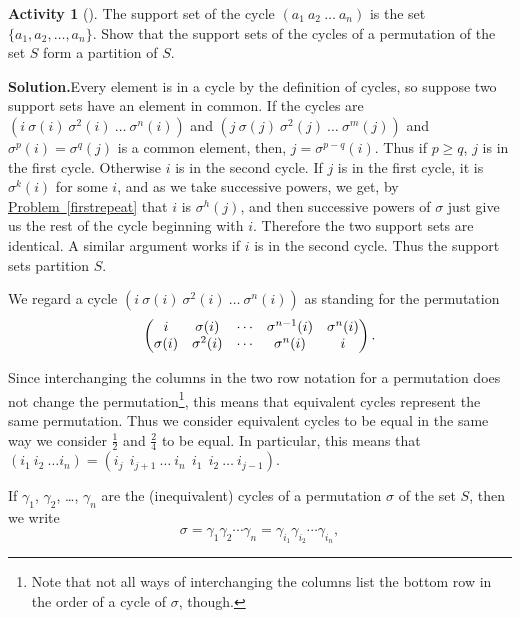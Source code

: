 \documentclass[10pt,]{book}
\theoremstyle{plain}
\theoremstyle{definition}
\newtheorem{activity}[project]{Activity}
\numberwithin{equation}{chapter}
\newcommand{\amp}{&}
\begin{document}
\begin{activity}[]\label{cyclepartition}
The support set of the cycle \((a_1\ a_2\ \ldots\ a_n)\) is the set \(\{a_1,a_2,\ldots,a_n\}\). Show that the support sets of the cycles of a permutation of the set \(S\) form a partition of \(S\).%
\par\medskip\noindent%
\textbf{Solution.}\quad Every element is in a cycle by the definition of cycles, so suppose two support sets have an element in common. If the cycles are \((i\
\sigma(i)\
\sigma^2(i)\ \ldots\ \sigma^n(i))\) and \((j\
\sigma(j)\
\sigma^2(j)\ \ldots\ \sigma^m(j))\) and \(\sigma^p(i) =\sigma^q(j)\) is a common element, then, \(j=\sigma^{p-q}(i)\). Thus if \(p\ge q\), \(j\) is in the first cycle. Otherwise \(i\) is in the second cycle. If \(j\) is in the first cycle, it is \(\sigma^k(i)\) for some \(i\), and as we take successive powers, we get, by \hyperref[firstrepeat]{Problem~\ref{firstrepeat}} that \(i\) is \(\sigma^h(j)\), and then successive powers of \(\sigma\) just give us the rest of the cycle beginning with \(i\). Therefore the two support sets are identical. A similar argument works if \(i\) is in the second cycle. Thus the support sets partition \(S\).%
\end{activity}
We regard a cycle \((i\
\sigma(i)\
\sigma^2(i)\ \ldots\ \sigma^n(i))\) as standing for the permutation%
\begin{equation*}
\begin{pmatrix}i\amp
\sigma(i)\amp
\cdots\amp \sigma^{n-1}(i)\amp \sigma^n(i)\cr
\sigma(i)\amp
\sigma^2(i)\amp \cdots\amp \sigma^n(i)\amp i
\end{pmatrix} .
\end{equation*}
%
\par
Since interchanging the columns in the two row notation for a permutation does not change the permutation\footnote{Note that not all ways of interchanging the columns list the bottom row in the order of a cycle of \(\sigma\), though.\label{fn-20}}, this means that equivalent cycles represent the same permutation. Thus we consider equivalent cycles to be equal in the same way we consider \(\frac{1}{2}\) and \(\frac{2}{4}\) to be equal. In particular, this means that \((i_1\ i_2\
\ldots i_n) = (i_j\ \ i_{j+1}\ \ldots\ i_n\ \ i_1\ \ i_2\ \ldots\ i_{j-1})\).%
\par
If \(\gamma_1\), \(\gamma_2\), \dots{}, \(\gamma_n\) are the (inequivalent) cycles of a permutation \(\sigma\) of the set \(S\), then we write%
\begin{equation*}
\sigma = \gamma_1\gamma_2\cdots\gamma_n= \gamma_{i_1}\gamma_{i_2}
\cdots \gamma_{i_n},
\end{equation*}
\end{document}
